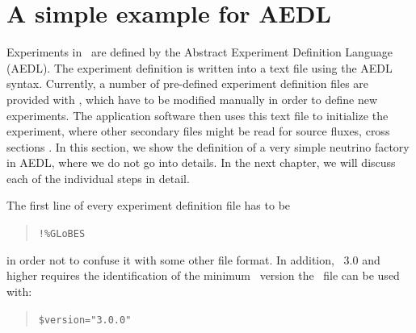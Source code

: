 \section{A simple example for AEDL}

Experiments in \GLOBES\ are defined by the Abstract Experiment Definition Language (AEDL). The experiment definition is written into a text file using the AEDL syntax. Currently, a number of pre-defined experiment definition files are provided with \GLOBES , which have to be modified manually in order to define new experiments.  The application software then uses this text file to initialize the experiment, where other secondary files might be read for source fluxes, cross sections \etc . In this section, we show the definition of a very simple neutrino factory in AEDL, where we do not go into details. In the next chapter, we will discuss each of the individual steps in detail.

The first line of every experiment definition file has to be
\begin{quote}
{\tt !\%GLoBES}
\end{quote}
in order not to confuse it with some other file format.
In addition, \GLOBES\ 3.0 and higher requires the identification of the
minimum \GLOBES\ version the \AEDL\ file can be used with:
\begin{quote}
{\tt \$version="3.0.0"}
\end{quote}

